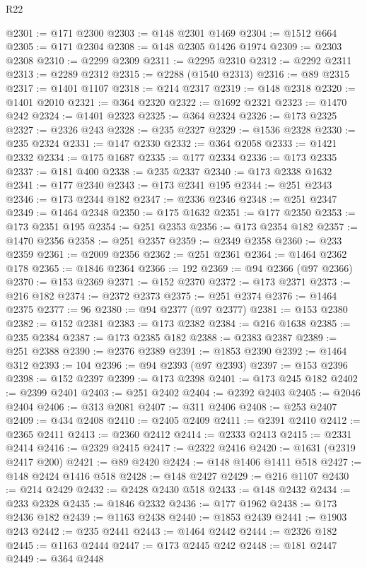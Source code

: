 \begin{lexlean}{R22}
\begin{coremodule}
@2301 := @171 @2300
@2303 := @148 @2301 @1469
@2304 := @1512 @664
@2305 := @171 @2304
@2308 := @148 @2305 @1426 @1974
@2309 := @2303 @2308
@2310 := @2299 @2309
@2311 := @2295 @2310
@2312 := @2292 @2311
@2313 := @2289 @2312
@2315 := @2288 (@1540 @2313)
@2316 := @89 @2315
@2317 := @1401 @1107
@2318 := @214 @2317
@2319 := @148 @2318
@2320 := @1401 @2010
@2321 := @364 @2320
@2322 := @1692 @2321
@2323 := @1470 @242
@2324 := @1401 @2323
@2325 := @364 @2324
@2326 := @173 @2325
@2327 := @2326 @243
@2328 := @235 @2327
@2329 := @1536 @2328
@2330 := @235 @2324
@2331 := @147 @2330
@2332 := @364 @2058
@2333 := @1421 @2332
@2334 := @175 @1687
@2335 := @177 @2334
@2336 := @173 @2335
@2337 := @181 @400
@2338 := @235 @2337
@2340 := @173 @2338 @1632
@2341 := @177 @2340
@2343 := @173 @2341 @195
@2344 := @251 @2343
@2346 := @173 @2344 @182
@2347 := @2336 @2346
@2348 := @251 @2347
@2349 := @1464 @2348
@2350 := @175 @1632
@2351 := @177 @2350
@2353 := @173 @2351 @195
@2354 := @251 @2353
@2356 := @173 @2354 @182
@2357 := @1470 @2356
@2358 := @251 @2357
@2359 := @2349 @2358
@2360 := @233 @2359
@2361 := @2009 @2356
@2362 := @251 @2361
@2364 := @1464 @2362 @178
@2365 := @1846 @2364
@2366 := 192
@2369 := @94 @2366 (@97 @2366)
@2370 := @153 @2369
@2371 := @152 @2370
@2372 := @173 @2371
@2373 := @216 @182
@2374 := @2372 @2373
@2375 := @251 @2374
@2376 := @1464 @2375
@2377 := 96
@2380 := @94 @2377 (@97 @2377)
@2381 := @153 @2380
@2382 := @152 @2381
@2383 := @173 @2382
@2384 := @216 @1638
@2385 := @235 @2384
@2387 := @173 @2385 @182
@2388 := @2383 @2387
@2389 := @251 @2388
@2390 := @2376 @2389
@2391 := @1853 @2390
@2392 := @1464 @312
@2393 := 104
@2396 := @94 @2393 (@97 @2393)
@2397 := @153 @2396
@2398 := @152 @2397
@2399 := @173 @2398
@2401 := @173 @245 @182
@2402 := @2399 @2401
@2403 := @251 @2402
@2404 := @2392 @2403
@2405 := @2046 @2404
@2406 := @313 @2081
@2407 := @311 @2406
@2408 := @253 @2407
@2409 := @434 @2408
@2410 := @2405 @2409
@2411 := @2391 @2410
@2412 := @2365 @2411
@2413 := @2360 @2412
@2414 := @2333 @2413
@2415 := @2331 @2414
@2416 := @2329 @2415
@2417 := @2322 @2416
@2420 := @1631 (@2319 @2417 @200)
@2421 := @89 @2420
@2424 := @148 @1406 @1411 @518
@2427 := @148 @2424 @1416 @518
@2428 := @148 @2427
@2429 := @216 @1107
@2430 := @214 @2429
@2432 := @2428 @2430 @518
@2433 := @148 @2432
@2434 := @233 @2328
@2435 := @1846 @2332
@2436 := @177 @1962
@2438 := @173 @2436 @182
@2439 := @1163 @2438
@2440 := @1853 @2439
@2441 := @1903 @243
@2442 := @235 @2441
@2443 := @1464 @2442
@2444 := @2326 @182
@2445 := @1163 @2444
@2447 := @173 @2445 @242
@2448 := @181 @2447
@2449 := @364 @2448

\end{coremodule}
\end{lexlean}
